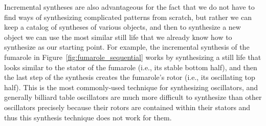 Incremental syntheses are also advantageous for the fact that we do not have to find ways of synthesizing complicated patterns from scratch, but rather we can keep a catalog of syntheses of various objects, and then to synthesize a new object we can use the most similar still life that we already know how to synthesize as our starting point. For example, the incremental synthesis of the fumarole in Figure~\ref{fig:fumarole_sequential} works by synthesizing a still life that looks similar to the stator of the fumarole (i.e., its stable bottom half), and then the last step of the synthesis creates the fumarole's rotor (i.e., its oscillating top half). This is the most commonly-used technique for synthesizing oscillators, and generally billiard table oscillators are much more difficult to synthesize than other oscillators precisely because their rotors are contained within their stators and thus this synthesis technique does not work for them.

